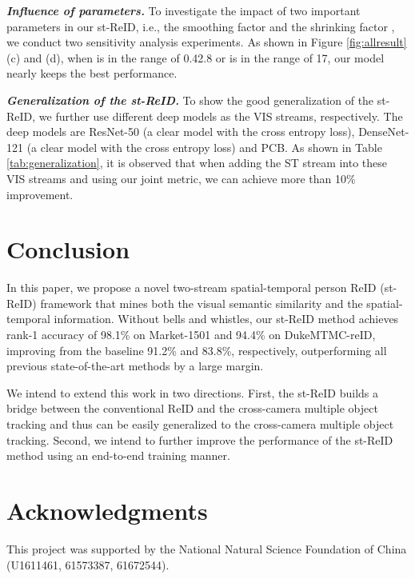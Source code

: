 \documentclass[letterpaper]{article} \usepackage{aaai19}  \usepackage{times}  \usepackage{helvet}  \usepackage{courier}  \usepackage{url}  \usepackage{graphicx}  \usepackage{subfig}
\begin{document}
\textbf{\emph{Influence of parameters.}} To investigate the impact of two important parameters in our st-ReID, i.e., the smoothing factor  and the shrinking factor , we conduct two sensitivity analysis experiments. As shown in Figure \ref{fig:allresult} (c) and (d), when  is in the range of 0.42.8 or  is in the range of 17, our model nearly keeps the best performance.

\textbf{\emph{Generalization of the st-ReID.}} To show the good generalization of the st-ReID, we further use different deep models as the VIS streams, respectively. The deep models are ResNet-50 (a clear model with the cross entropy loss), DenseNet-121 (a clear model with the cross entropy loss) and PCB. As shown in Table \ref{tab:generalization}, it is observed that when adding the ST stream into these VIS streams and using our joint metric, we can achieve more than 10\% improvement.

\section{Conclusion}
\label{sec:con}
In this paper, we propose a novel two-stream spatial-temporal person ReID (st-ReID) framework that mines both the visual semantic similarity and the spatial-temporal information. Without bells and whistles, our st-ReID method achieves rank-1 accuracy of 98.1\% on Market-1501 and 94.4\% on  DukeMTMC-reID, improving from the baseline 91.2\% and 83.8\%, respectively, outperforming all previous state-of-the-art methods by a large margin.


We intend to extend this work in two directions. First, the st-ReID builds a bridge between the conventional ReID and the cross-camera multiple object tracking and thus can be easily generalized to the cross-camera multiple object tracking. Second, we intend to further improve the performance of the st-ReID method using an end-to-end training manner.

\section{Acknowledgments}
This project was supported by the National Natural Science Foundation of China (U1611461, 61573387, 61672544).




\end{document}
